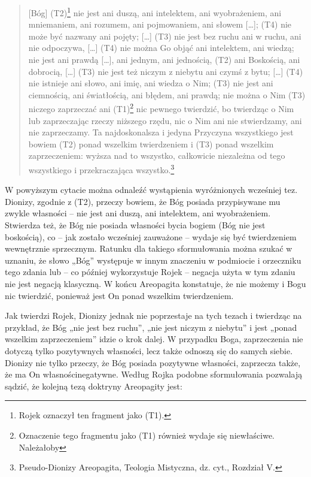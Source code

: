 \begin{quote}
    [Bóg] (T2)\footnote{Rojek oznaczył ten fragment jako (T1). } nie
jest ani duszą, ani intelektem, ani wyobrażeniem, ani mniemaniem, ani
rozumem, ani pojmowaniem, ani słowem […]; (T4) nie może być nazwany ani
pojęty; […] (T3) nie jest bez ruchu ani w ruchu, ani nie odpoczywa, […]
(T4) nie można Go objąć ani intelektem, ani wiedzą; nie jest ani prawdą
[…], ani jednym, ani jednością, (T2) ani Boskością, ani dobrocią, […]
(T3) nie jest też niczym z niebytu ani czymś z bytu; […] (T4) nie
istnieje ani słowo, ani imię, ani wiedza o Nim; (T3) nie jest ani
ciemnością, ani światłością, ani błędem, ani prawdą; nie można o Nim
(T3) niczego zaprzeczać ani (T1)\footnote{Oznaczenie tego fragmentu
jako (T1) również wydaje się niewłaściwe. Należałoby } nic pewnego
twierdzić, bo twierdząc o Nim lub zaprzeczając rzeczy niższego rzędu,
nic o Nim ani nie stwierdzamy, ani nie zaprzeczamy. Ta najdoskonalsza i
jedyna Przyczyna wszystkiego jest bowiem (T2) ponad wszelkim
twierdzeniem i (T3) ponad wszelkim zaprzeczeniem: wyższa nad to
wszystko, całkowicie niezależna od tego wszystkiego i przekraczająca
wszystko.\footnote{Pseudo-Dionizy Areopagita, Teologia Mistyczna, dz.
cyt., Rozdział V. }
\end{quote}




W powyższym cytacie można odnaleźć wystąpienia wyróżnionych wcześniej
tez. Dionizy, zgodnie z (T2), przeczy bowiem, że Bóg posiada
przypisywane mu zwykle własności -- nie jest ani duszą, ani intelektem,
ani wyobrażeniem. Stwierdza też, że Bóg nie posiada własności bycia
bogiem (Bóg nie jest boskością), co -- jak zostało wcześniej zauważone –
wydaje się być twierdzeniem wewnętrznie sprzecznym. Ratunku dla takiego
sformułowania można szukać w uznaniu, że słowo „Bóg” występuje w innym
znaczeniu w podmiocie i orzeczniku tego zdania lub -- co później
wykorzystuje Rojek -- negacja użyta w tym zdaniu nie jest negacją
klasyczną. W końcu Areopagita konstatuje, że nie możemy i Bogu nic
twierdzić, ponieważ jest On ponad wszelkim twierdzeniem.

Jak twierdzi Rojek, Dionizy jednak nie poprzestaje na tych tezach i
twierdząc na przykład, że Bóg „nie jest bez ruchu”, „nie jest niczym z
niebytu” i jest „ponad wszelkim zaprzeczeniem” idzie o krok dalej. W
przypadku Boga, zaprzeczenia nie dotyczą tylko pozytywnych własności,
lecz także odnoszą się do samych siebie. Dionizy nie tylko przeczy, że
Bóg posiada pozytywne własności, zaprzecza także, że ma On
własnościnegatywne. Według Rojka podobne sformułowania pozwalają
sądzić, że kolejną tezą doktryny Areopagity jest:


